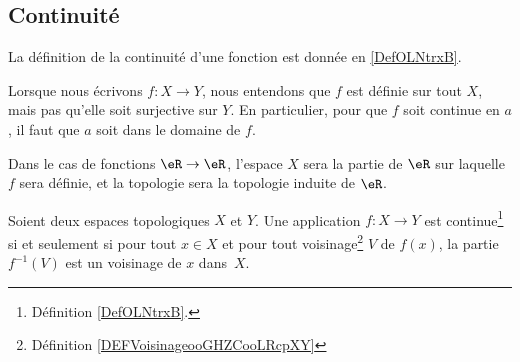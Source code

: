 \subsection{Continuité}

La définition de la continuité d'une fonction est donnée en \ref{DefOLNtrxB}.

\begin{normaltext}
    Lorsque nous écrivons \( f\colon X\to Y\), nous entendons que \( f\) est définie sur tout \( X\), mais pas qu'elle soit surjective sur \( Y\). En particulier, pour que \( f\) soit continue en \( a\), il faut que \( a\) soit dans le domaine de \( f\). 

    Dans le cas de fonctions \( \eR\to \eR\), l'espace \( X\) sera la partie de \( \eR\) sur laquelle \( f\) sera définie, et la topologie sera la topologie induite de \( \eR\).
\end{normaltext} 

\begin{proposition}       \label{PROPooOXBCooIzLaPe}
    Soient deux espaces topologiques \( X\) et \( Y\). Une application \( f\colon X\to Y\) est continue\footnote{Définition \ref{DefOLNtrxB}.} si et seulement si pour tout \( x\in X\) et pour tout voisinage\footnote{Définition \ref{DEFVoisinageooGHZCooLRcpXY}} \( V\) de \( f(x)\), la partie \( f^{-1}(V)\) est un voisinage de \( x\) dans~\( X\).
\end{proposition}

